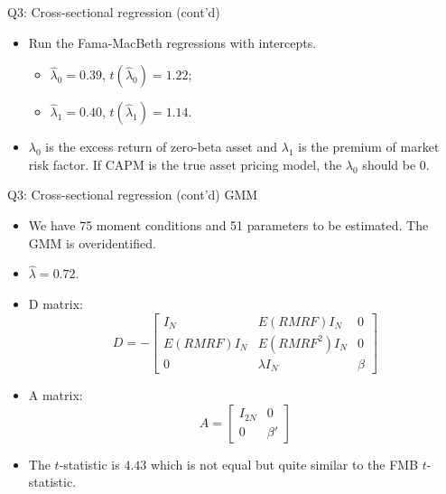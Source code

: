 \documentclass[10pt,t]{beamer}
\begin{document}
\begin{frame}{Q3: Cross-sectional regression (cont'd)}
\begin{itemize}
  \item Run the Fama-MacBeth regressions with intercepts.
  \begin{itemize}
    \item $\hat{\lambda}_0 = 0.39$, $t(\hat{\lambda}_0) = 1.22$;
    \item $\hat{\lambda}_1 = 0.40$, $t(\hat{\lambda}_1) = 1.14$.
  \end{itemize}
  \item $\lambda_0$ is the excess return of zero-beta asset and $\lambda_1$ is the premium of market risk factor. If CAPM is the true asset pricing model, the $\lambda_0$ should be $0$.
\end{itemize}
\end{frame}


\begin{frame}{Q3: Cross-sectional regression (cont'd)}
GMM
\begin{itemize}
  \item We have 75 moment conditions and 51 parameters to be estimated. The GMM is overidentified.
  \item $\hat{\lambda} = 0.72$.
  \item D matrix:
  $$
  D = - \left[\begin{array}{ccc} I_N & E(RMRF)I_N & 0 \\
  E(RMRF)I_N & E(RMRF^2)I_N & 0 \\
  0 & \lambda I_N & \beta\end{array}\right]
  $$
  \item A matrix:
  $$
  A = \left[\begin{array}{cc} I_{2N} & 0 \\
  0 & \beta' \end{array}\right]
  $$
  \item The $t$-statistic is $4.43$ which is not equal but quite similar to the FMB $t$-statistic.
\end{itemize}
\end{frame}
\end{document}
